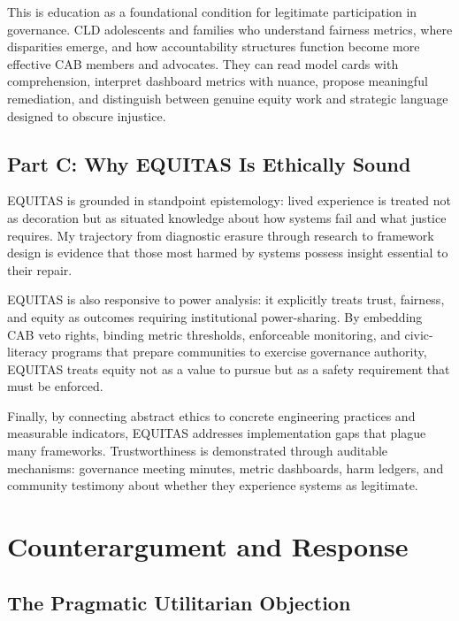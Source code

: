 \documentclass[12pt,a4paper]{article}
\begin{document}
This is education as a foundational condition for legitimate participation in governance. CLD adolescents and families who understand fairness metrics, where disparities emerge, and how accountability structures function become more effective CAB members and advocates. They can read model cards with comprehension, interpret dashboard metrics with nuance, propose meaningful remediation, and distinguish between genuine equity work and strategic language designed to obscure injustice.\cite{munn_idai700}

\subsection{Part C: Why EQUITAS Is Ethically Sound}

EQUITAS is grounded in standpoint epistemology: lived experience is treated not as decoration but as situated knowledge about how systems fail and what justice requires.\cite{garcia_ed415} My trajectory from diagnostic erasure through research to framework design is evidence that those most harmed by systems possess insight essential to their repair.

EQUITAS is also responsive to power analysis: it explicitly treats trust, fairness, and equity as outcomes requiring institutional power-sharing.\cite{munn_idai700} By embedding CAB veto rights, binding metric thresholds, enforceable monitoring, and civic-literacy programs that prepare communities to exercise governance authority, EQUITAS treats equity not as a value to pursue but as a safety requirement that must be enforced.\cite{lekadir2025}

Finally, by connecting abstract ethics to concrete engineering practices and measurable indicators, EQUITAS addresses implementation gaps that plague many frameworks. Trustworthiness is demonstrated through auditable mechanisms: governance meeting minutes, metric dashboards, harm ledgers, and community testimony about whether they experience systems as legitimate.\cite{sagona2025}

\section{Counterargument and Response}

\subsection{The Pragmatic Utilitarian Objection}
\end{document}
